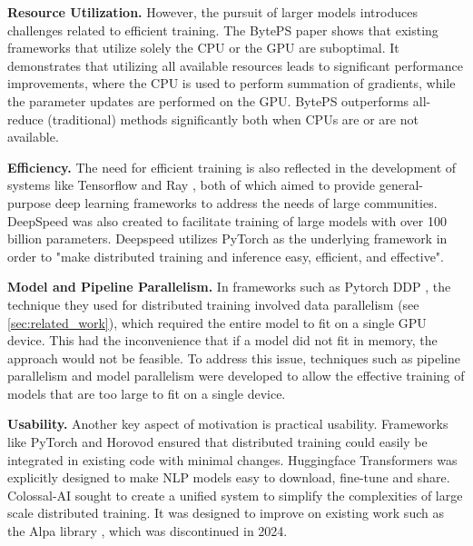 \textbf{Resource Utilization.}
However, the pursuit of larger models introduces challenges related to efficient training. The
BytePS paper \cite{jiang_unified_nodate} shows that existing frameworks that utilize solely the
CPU or the GPU are suboptimal. It demonstrates that utilizing all available resources leads to
significant performance improvements, where the CPU is used to perform summation of gradients,
while the parameter updates are performed on the GPU. BytePS outperforms all-reduce (traditional)
methods significantly both when CPUs are or are not available.

\textbf{Efficiency.}
The need for efficient training is also reflected in the development of systems like Tensorflow
\cite{abadi_tensorflow_2016} and Ray \cite{moritz_ray_2018}, both of which aimed to provide
general-purpose deep learning frameworks to address the needs of large communities. DeepSpeed
\cite{rasley_deepspeed_2020} was also created to facilitate training of large models with over 100
billion parameters. Deepspeed utilizes PyTorch \cite{noauthor_pytorchpytorch_nodate} as the
underlying framework in order to "make distributed training and inference easy, efficient, and
effective".

\textbf{Model and Pipeline Parallelism.}
In frameworks such as Pytorch DDP \cite{li_pytorch_2020}, the technique they used for distributed
training involved data parallelism (see \ref{sec:related_work}), which required the entire model to
fit on a single GPU device. This had the inconvenience that if a model did not fit in memory, the
approach would not be feasible. To address this issue, techniques such as pipeline parallelism
\cite{huang_gpipe_2019} and model parallelism \cite{shoeybi_megatron-lm_2020} were developed to
allow the effective training of models that are too large to fit on a single device.

\textbf{Usability.}
Another key aspect of motivation is practical usability. Frameworks like PyTorch \cite{li_pytorch_2020}
and Horovod \cite{sergeev_horovod_2018} ensured that distributed training could easily be integrated
in existing code with minimal changes. Huggingface Transformers \cite{wolf_huggingfaces_2020} was
explicitly designed to make NLP models easy to download, fine-tune and share. Colossal-AI
\cite{li_colossal-ai_2023} sought to create a unified system to simplify the complexities of
large scale distributed training. It was designed to improve on existing work such as the Alpa library
\cite{noauthor_alpa-projectsalpa_nodate}, which was discontinued in 2024.

